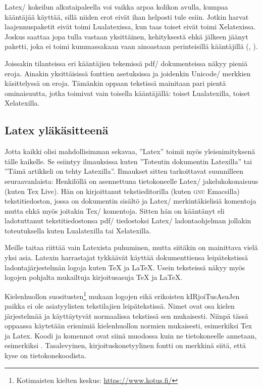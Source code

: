 Latex\-/ kokeilun alkutaipaleella voi vaikka arpoa kolikon avulla,
kumpaa kääntäjää käyttää, sillä niiden erot eivät ihan helposti tule
esiin. Jotkin harvat laajennuspaketit eivät toimi Lualatexissa, kun taas
toiset eivät toimi Xelatexissa. Joskus saattaa jopa tulla vastaan
yksittäinen, kehityksestä ehkä jälkeen jäänyt paketti, joka ei toimi
kummassakaan vaan ainoastaan perinteisillä kääntäjillä (,
).

Joissakin tilanteissa eri kääntäjien tekemissä pdf\-/ dokumenteissa
näkyy pieniä eroja. Ainakin yksittäisissä fonttien asetuksissa ja
joidenkin Unicode\-/ merkkien käsittelyssä on eroja. Tämänkin oppaan
tekstissä mainitaan pari pientä ominaisuutta, jotka toimivat vain
toisella kääntäjällä: toiset Lualatexilla, toiset Xelatexilla.

\subsection{Latex yläkäsitteenä}

Jotta kaikki olisi mahdollisimman sekavaa, ''Latex'' toimii myös
yleisnimityksenä tälle kaikelle. Se esiintyy ilmauksissa kuten
''Toteutin dokumentin Latexilla'' tai ''Tämä artikkeli on tehty
Latexilla''. Ilmaukset sitten tarkoittavat suunnilleen seuraavanlaista:
Henkilöllä on asennettuna tietokoneelle Latex\-/ jakelukokonaisuus
(kuten Tex Live). Hän on kirjoittanut tekstieditorilla (kuten
\textsc{gnu} Emacsilla) tekstitiedoston, jossa on dokumentin sisältö ja
Latex\-/ merkintäkielisiä komentoja mutta ehkä myös joitakin Tex\-/
komentoja. Sitten hän on kääntänyt eli ladotuttanut tekstitiedostonsa
pdf\-/ tiedostoksi Latex\-/ ladontaohjelman jollakin toteutuksella kuten
Lualatexilla tai Xelatexilla.

Meille taitaa riittää vain Latexista puhuminen, mutta siitäkin on
mainittava vielä yksi asia. Latexin harrastajat tykkäävät käyttää
dokumenttiensa leipätekstissä ladontajärjestelmän logoja kuten \TeX{} ja
\LaTeX{}. Usein teksteissä näkyy myös logojen pohjalta mukailtuja
kirjoitusasuja TeX ja LaTeX.

Kielenhuollon suositusten\footnote{Kotimaisten kielten keskus:
  \url{https://www.kotus.fi/}} mukaan logojen eikä erikoisten
kIRjoiTusAsuJen paikka ei ole asiatyylisten tekstilajien leipätekstissä.
Nimet ovat osa kielen järjestelmää ja käyttäytyvät normaalissa tekstissä
sen mukaisesti. Niinpä tässä oppaassa käytetään erisnimiä kielenhuollon
normien mukaisesti, esimerkiksi Tex ja Latex. Koodi ja komennot ovat
siinä muodossa kuin ne tietokoneelle annetaan, esimerkiksi
. Tasalevyinen, kirjoituskonetyylinen fontti on merkkinä
siitä, että kyse on tietokonekoodista.

